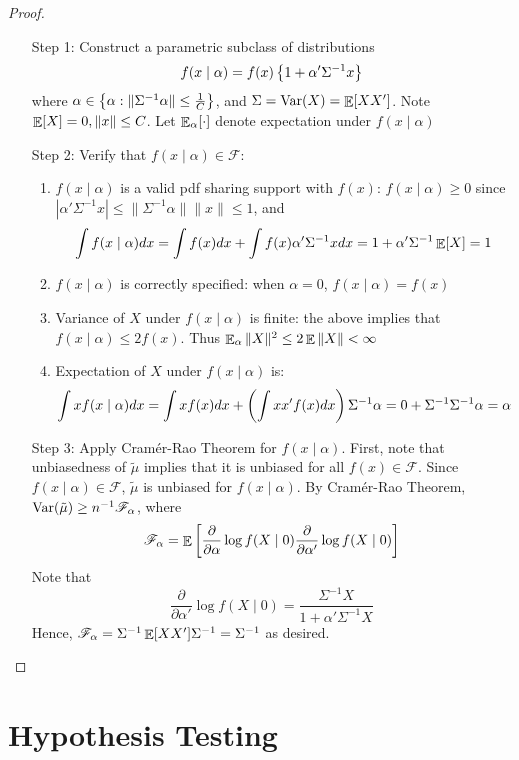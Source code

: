 \documentclass[10pt]{article}
\begin{document}
\begin{proof}
	\begin{itemize}
		\item[Step 1:] Construct a parametric subclass of distributions
		\[
		f(x \mid \alpha) = f(x) \left\{ 1 + \alpha' \Sigma^{-1} x\right\}
		\] 
		where $\alpha \in \left\{ \alpha : \|\Sigma^{-1}\alpha\|\le \frac{1}{C}\right\}$, and $\Sigma = \mathop{\rm Var}(X) = \mathop{\mathbb{E}}[XX']$. Note $\mathop{\mathbb{E}} [X] = 0, \|x\|\le C$. Let $\mathop{\mathbb{E}}_\alpha[\cdot] $ denote expectation under $f(x \mid \alpha)$
		\item[Step 2:] Verify that $f(x \mid \alpha) \in \mathcal{F}$:
		\begin{enumerate}
			\item $f(x \mid \alpha)$ is a valid pdf sharing support with $f(x)$: $f(x\mid\alpha) \ge 0$ since $|\alpha'\Sigma^{-1}x|\le \|\Sigma^{-1}\alpha\|\|x\|\le 1$, and
			\[
			\int f(x \mid \alpha)dx = \int f(x)dx + \int f(x) \alpha' \Sigma^{-1}xdx = 1 + \alpha'\Sigma^{-1} \mathop{\mathbb{E}}[X] = 1
			\]
			\item $f(x \mid \alpha)$ is correctly specified: when $\alpha = 0$, $f(x \mid \alpha) = f(x)$
			\item Variance of $X$ under $f(x \mid \alpha)$ is finite: the above implies that $f(x \mid \alpha) \le 2f(x)$. Thus $\mathop{\mathbb{E}}_\alpha \|X\|^2 \le 2\mathop{\mathbb{E}}\|X\| < \infty$
			\item Expectation of $X$ under $f(x \mid \alpha)$ is:
			\[
			\int x f(x\mid\alpha)dx = \int xf(x)dx + \left( \int xx'f(x)dx\right) \Sigma^{-1}\alpha = 0 + \Sigma^{-1}\Sigma^{-1}\alpha = \alpha
			\]
		\end{enumerate}
		\item[Step 3:] Apply Cram\'{e}r-Rao Theorem for $f(x \mid \alpha)$. First, note that unbiasedness of $\tilde{\mu}$ implies that it is unbiased for all $f(x) \in \mathcal{F}$. Since $f(x \mid \alpha) \in \mathcal{F}$, $\tilde{\mu}$ is unbiased for $f(x \mid \alpha)$. By Cram\'{e}r-Rao Theorem, $\mathop{\rm Var}(\tilde{\mu}) \ge n^{-1} \mathscr{F}_{\alpha}$, where
		\[
		\mathscr{F}_\alpha = \mathop{\mathbb{E}}\left[ \frac{\partial}{\partial \alpha} \log f(X \mid 0)\frac{\partial}{\partial \alpha'} \log f(X \mid 0)\right]
		\]
		Note that
		\[
		\frac{\partial}{\partial \alpha'} \log f(X \mid 0) = \frac{\Sigma^{-1}X}{1 + \alpha'\Sigma^{-1}X}
		\]
		Hence, $\mathscr{F}_\alpha = \Sigma^{-1} \mathop{\mathbb{E}}[XX'] \Sigma^{-1} = \Sigma^{-1}$ as desired.
	\end{itemize}
\end{proof}

\newpage

\section{Hypothesis Testing}
\end{document}
